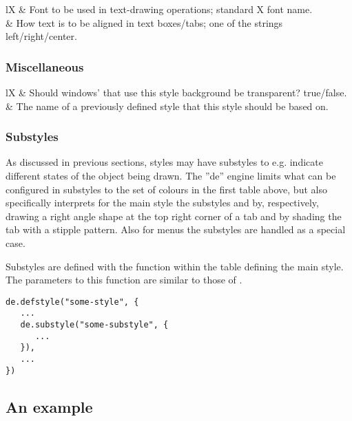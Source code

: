 \begin{tabularx}{\linewidth}{lX}
 & Font to be used in text-drawing operations; standard X font
	     name. \\
 & How text is to be aligned in text boxes/tabs; one of
		   the strings left\nobreak/right\nobreak/center. \\
\end{tabularx}


\subsubsection{Miscellaneous}


\begin{tabularx}{\linewidth}{lX}
 & Should windows' that use this style
	background be transparent? true/false. \\
 & The name of a previously defined style that this
	style should be based on. \\
\end{tabularx}


\subsubsection{Substyles}

As discussed in previous sections, styles may have substyles to e.g.
indicate different states of the object being drawn. The ''de'' engine
limits what can be configured in substyles to the set of colours in the
first table above, but also specifically interprets for the main style
 the substyles  and 
by, respectively, drawing a right angle shape at the top right corner 
of a tab and by shading the tab with a stipple pattern. Also for
menus the substyles  are handled as a special case.

Substyles are defined with the function  within the
table defining the main style. The parameters to this function are 
similar to those of .

\begin{verbatim}
de.defstyle("some-style", {
   ...
   de.substyle("some-substyle", {
      ...
   }),
   ...
})
\end{verbatim}


\subsection{An example}

